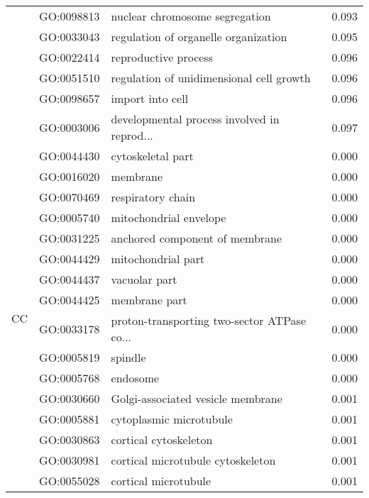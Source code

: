 \begin{longtable}{lllr}
   & GO:0098813 &               nuclear chromosome segregation &         0.093 \\
   & GO:0033043 &         regulation of organelle organization &         0.095 \\
   & GO:0022414 &                         reproductive process &         0.096 \\
   & GO:0051510 &     regulation of unidimensional cell growth &         0.096 \\
   & GO:0098657 &                             import into cell &         0.096 \\
   & GO:0003006 &  developmental process involved in reprod... &         0.097 \\
\cline{1-4}
\multirow{52}{*}{CC} & GO:0044430 &                            cytoskeletal part &         0.000 \\
   & GO:0016020 &                                     membrane &         0.000 \\
   & GO:0070469 &                            respiratory chain &         0.000 \\
   & GO:0005740 &                       mitochondrial envelope &         0.000 \\
   & GO:0031225 &               anchored component of membrane &         0.000 \\
   & GO:0044429 &                           mitochondrial part &         0.000 \\
   & GO:0044437 &                                vacuolar part &         0.000 \\
   & GO:0044425 &                                membrane part &         0.000 \\
   & GO:0033178 &  proton-transporting two-sector ATPase co... &         0.000 \\
   & GO:0005819 &                                      spindle &         0.000 \\
   & GO:0005768 &                                     endosome &         0.000 \\
   & GO:0030660 &            Golgi-associated vesicle membrane &         0.001 \\
   & GO:0005881 &                      cytoplasmic microtubule &         0.001 \\
   & GO:0030863 &                        cortical cytoskeleton &         0.001 \\
   & GO:0030981 &            cortical microtubule cytoskeleton &         0.001 \\
   & GO:0055028 &                         cortical microtubule &         0.001 \\

\end{longtable}
